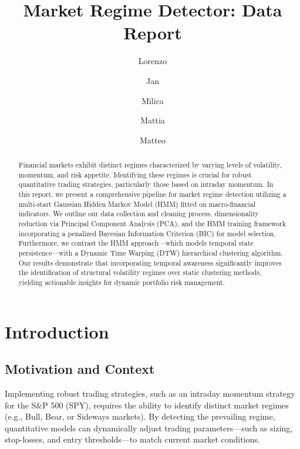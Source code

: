 \documentclass[a4paper,fleqn]{cas-sc}
\begin{document}

\title[mode = title]{Market Regime Detector: Data Report}


\author[1]{Lorenzo}
\author[1]{Jan}
\author[1]{Milica}
\author[1]{Mattia}
\author[1]{Matteo}


\begin{abstract}
Financial markets exhibit distinct regimes characterized by varying levels of volatility, momentum, and risk appetite. Identifying these regimes is crucial for robust quantitative trading strategies, particularly those based on intraday momentum. In this report, we present a comprehensive pipeline for market regime detection utilizing a multi-start Gaussian Hidden Markov Model (HMM) fitted on macro-financial indicators. We outline our data collection and cleaning process, dimensionality reduction via Principal Component Analysis (PCA), and the HMM training framework incorporating a penalized Bayesian Information Criterion (BIC) for model selection. Furthermore, we contrast the HMM approach—which models temporal state persistence—with a Dynamic Time Warping (DTW) hierarchical clustering algorithm. Our results demonstrate that incorporating temporal awareness significantly improves the identification of structural volatility regimes over static clustering methods, yielding actionable insights for dynamic portfolio risk management.
\end{abstract}

\maketitle

\section{Introduction}

\subsection{Motivation and Context}
Implementing robust trading strategies, such as an intraday momentum strategy for the S\&P 500 (SPY), requires the ability to identify distinct market regimes (e.g., Bull, Bear, or Sideways markets). By detecting the prevailing regime, quantitative models can dynamically adjust trading parameters—such as sizing, stop-losses, and entry thresholds—to match current market conditions.
\end{document}
